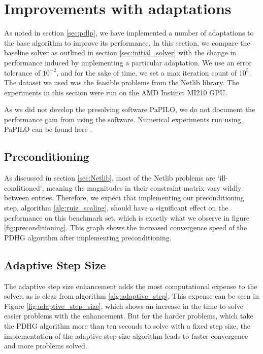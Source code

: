 \documentclass[twoside,12pt,openright]{report}  %
\begin{document}


\section{Improvements with adaptations}\label{sec:pdlp_results}
As noted in section \ref{sec:pdlp}, we have implemented a number of adaptations to the base algorithm to improve its performance. In this section, we compare the baseline solver as outlined in section \ref{sec:initial_solver} with the change in performance induced by implementing a particular adaptation. We use an error tolerance of $10^{-2}$, and for the sake of time, we set a max iteration count of $10^5$. The dataset we used was the feasible problems from the Netlib library. The experiments in this section were run on the AMD Instinct MI210 GPU.

As we did not develop the presolving software PaPILO, we do not document the performance gain from using the software. Numerical experiments run using PaPILO can be found here \cite{papilo}. 
\subsection{Preconditioning}
As discussed in section \ref{sec:Netlib}, most of the Netlib problems are `ill-conditioned', meaning the magnitudes in their constraint matrix vary wildly between entries. Therefore, we expect that implementing our preconditioning step, algorithm \ref{alg:ruiz_scaling}, should have a significant effect on the performance on this benchmark set, which is exactly what we observe in figure \ref{fig:preconditioning}. This graph shows the increased convergence speed of the PDHG algorithm after implementing preconditioning.

\subsection{Adaptive Step Size}
The adaptive step size enhancement adds the most computational expense to the solver, as is clear from algorithm \ref{alg:adaptive_step}. This expense can be seen in Figure \ref{fig:adaptive_step_size}, which shows an increase in the time to solve easier problems with the enhancement. But for the harder problems, which take the PDHG algorithm more than ten seconds to solve with a fixed step size, the implementation of the adaptive step size algorithm leads to faster convergence and more problems solved.
\end{document}
